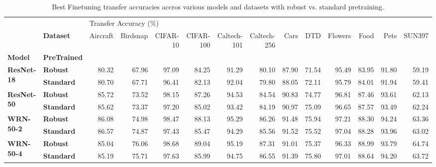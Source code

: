 \begin{table}
\centering
\caption{Best Finetuning transfer accuracies accros various models and datasets with robust vs. standard pretraining.}
\label{table:headline-table-Finetuning}
\begin{tabular}{llrrrrrrrrrrrr}
\toprule
         & {} & \multicolumn{12}{l}{Transfer Accuracy (\%)} \\
         & \textbf{Dataset} &              Aircraft & Birdsnap & CIFAR-10 & CIFAR-100 & Caltech-101 & Caltech-256 &  Cars &   DTD & Flowers &  Food &  Pets & SUN397 \\
\textbf{Model} & \textbf{PreTrained} &                       &          &          &           &             &             &       &       &         &       &       &        \\
\midrule
\multirow{2}{*}{\textbf{ResNet-18}} & \textbf{Robust} &                 80.32 &    67.96 &    97.09 &     84.25 &       91.29 &       80.10 & 87.90 & 71.54 &   95.49 & 83.95 & 91.80 &  59.19 \\
         & \textbf{Standard} &                 80.70 &    67.71 &    96.41 &     82.13 &       92.04 &       79.80 & 88.05 & 72.11 &   95.79 & 84.01 & 91.94 &  59.41 \\
\cline{1-14}
\multirow{2}{*}{\textbf{ResNet-50}} & \textbf{Robust} &                 85.72 &    73.52 &    98.15 &     87.26 &       94.53 &       84.54 & 90.83 & 74.77 &   96.81 & 87.46 & 93.61 &  62.13 \\
         & \textbf{Standard} &                 85.62 &    73.37 &    97.20 &     85.02 &       93.42 &       84.19 & 90.97 & 75.09 &   96.65 & 87.57 & 93.49 &  62.24 \\
\cline{1-14}
\multirow{2}{*}{\textbf{WRN-50-2}} & \textbf{Robust} &                 86.08 &    74.98 &    98.47 &     88.13 &       95.29 &       86.26 & 91.48 & 75.94 &   97.21 & 88.30 & 94.24 &  63.36 \\
         & \textbf{Standard} &                 86.57 &    74.87 &    97.43 &     85.47 &       94.29 &       85.56 & 91.52 & 75.52 &   97.04 & 88.28 & 93.96 &  63.02 \\
\cline{1-14}
\multirow{2}{*}{\textbf{WRN-50-4}} & \textbf{Robust} &                 85.04 &    76.06 &    98.68 &     89.04 &       95.19 &       87.31 & 91.01 & 75.37 &   96.33 & 88.99 & 93.79 &  64.74 \\
         & \textbf{Standard} &                 85.19 &    75.71 &    97.63 &     85.99 &       94.75 &       86.55 & 91.39 & 75.80 &   97.01 & 88.64 & 94.20 &  63.72 \\
\bottomrule
\end{tabular}
\end{table}
